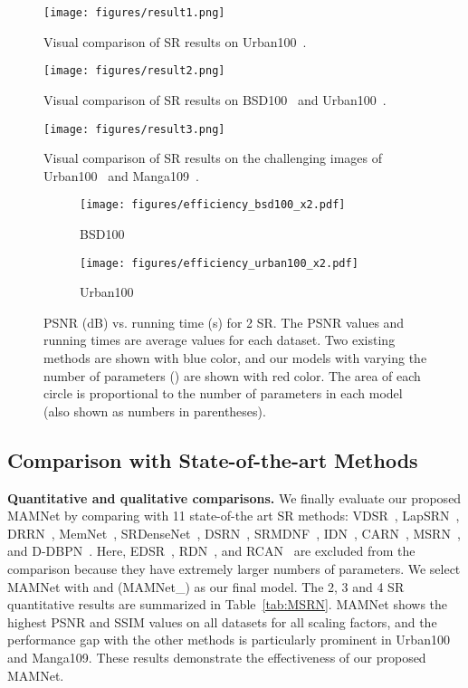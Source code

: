 \documentclass[final,5p,times,twocolumn]{elsarticle}
\begin{document}
\begin{figure*}[t]
	\centering
	\texttt{[image: figures/result1.png]}
	\caption{Visual comparison of  SR results on Urban100~\cite{huang2015single}.}
	\label{fig:result1}
\end{figure*}

\begin{figure*}[t]
	\centering
	\texttt{[image: figures/result2.png]}
	\caption{Visual comparison of  SR results on BSD100~\cite{martin2001database} and Urban100~\cite{huang2015single}.}
	\label{fig:result2}
\end{figure*}

\begin{figure*}[t]
	\centering
	\texttt{[image: figures/result3.png]}
	\caption{Visual comparison of  SR results on the challenging images of Urban100~\cite{huang2015single} and Manga109~\cite{matsui2017sketch}.}
	\label{fig:result3}
\end{figure*}

\begin{figure}[t]
	\centering
	\begin{subfigure}[b]{0.405\textwidth}
		\texttt{[image: figures/efficiency\_bsd100\_x2.pdf]}
		\caption{BSD100}
	\end{subfigure}
	\begin{subfigure}[b]{0.4\textwidth}
		\texttt{[image: figures/efficiency\_urban100\_x2.pdf]}
		\caption{Urban100}
	\end{subfigure} 
	\caption{PSNR (dB) vs. running time (s) for 2 SR. The PSNR values and running times are average values for each dataset. Two existing methods are shown with blue color, and our models with varying the number of parameters () are shown with red color. The area of each circle is proportional to the number of parameters in each model (also shown as numbers in parentheses). 
	}
	\label{fig:result2}	
\end{figure}

\subsection{Comparison with State-of-the-art Methods}
\textbf{Quantitative and qualitative comparisons.}
We finally evaluate our proposed MAMNet by comparing with 11 state-of-the art SR methods: VDSR~\cite{kim2016accurate}, LapSRN~\cite{lai2017laplacian}, DRRN~\cite{tai2017image}, MemNet~\cite{tai2017memnet}, SRDenseNet~\cite{tong2017image}, DSRN~\cite{han2018image}, SRMDNF~\cite{zhang2018learning}, IDN~\cite{hui2018fast}, CARN~\cite{ahn2018fast}, MSRN~\cite{li2018multi}, and D-DBPN~\cite{haris2018deep}.
Here, EDSR~\cite{li2018multi}, RDN~\cite{zhang2018residual}, and RCAN~\cite{zhang2018rcan} are excluded from the comparison because they have extremely larger numbers of parameters.
We select MAMNet with  and  (MAMNet\_) as our final model.
The 2, 3 and 4 SR quantitative results are summarized in Table~\ref{tab:MSRN}.
MAMNet shows the highest PSNR and SSIM values on all datasets for all scaling factors, and the performance gap with the other methods is particularly prominent in Urban100 and Manga109.
These results demonstrate the effectiveness of our proposed MAMNet.
\end{document}

